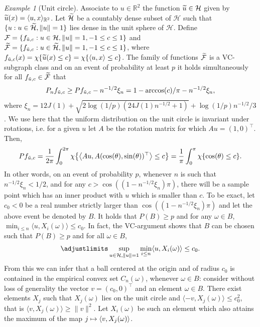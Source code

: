 \documentclass[AHL,Unicode,longabstracts,published]{cedram}
\theoremstyle{remark}
\newtheorem{examl}{Example}
\newcommand{\R}{\mathbb{R}}
\newcommand{\cH}{\mathcal{H}}
\newcommand{\clF}{\mathcal{F}}
\let\oldtilde\tilde
\renewcommand*{\tilde}[1]{\mathchoice{\widetilde{#1}}{\widetilde{#1}}{\oldtilde{#1}}{\oldtilde{#1}}}
\let\oldmapsto\mapsto
\renewcommand*{\mapsto}{\mathchoice{\longmapsto}{\oldmapsto}{\oldmapsto}{\oldmapsto}}
\let\originalleft\left
\let\originalright\right
\renewcommand{\left}{\mathopen{}\mathclose\bgroup\originalleft}
\renewcommand{\right}{\aftergroup\egroup\originalright}
\begin{document}
\begin{examl}[{Unit circle}]
Associate to $u \in \R^2$ the function $\tilde u \in \cH$ given by $\tilde u(x) = \langle u, x \rangle_{\R^2}$. Let $\tilde \cH$ be a countably dense subset of $\cH$ such that $\{u : u\in \tilde \cH, \|u\|=1\}$ lies dense in the unit sphere of $\cH$. Define $\clF = \{f_{\tilde u,c} : u \in \cH, \|u\|=1, -1 \leq c \leq 1 \}$ and $\tilde{\clF} = \{f_{\tilde u,c} : u \in \tilde{\cH},\linebreak \|u\|=1, -1 \leq c \leq 1 \}$, where $f_{\tilde u,c}(x) = \chi\{ \tilde u(x) \leq c\} = \chi\{\langle u, x\rangle \leq c\}$. The family of functions $\tilde{\clF}$ is a VC-subgraph class and on an event of probability at least $p$ it holds simultaneously for all $f_{\tilde u,c} \in \tilde{\clF}$ that
\begin{align*}
P_n f_{\tilde u,c} \geq P f_{\tilde u,c} - n^{-1/2} \xi_n = 1- \arccos(c)/\pi - n^{-1/2} \xi_n,
\end{align*}
where $\xi_n = 12 J(1) + \sqrt{2 \log(1/p) (24 J(1) n^{-1/2} + 1)} + \log(1/p)n^{-1/2}/3$. We use here that the uniform distribution on the unit circle is invariant under rotations, i.e. for a given $u$ let $A$ be the rotation matrix for which $Au = (1, 0)^\top$. Then,
\[
P f_{\tilde u,c} = \frac{1}{2\pi} \int_0^{2\pi} \chi\left\{\left\langle A u, A (\cos(\theta),\sin(\theta))^\top \right\rangle \leq c \right\} = \frac{1}{\pi} \int_0^{\pi} \chi\{\cos(\theta) \leq c \}.
\]
In other words, on an event of probability $p$, whenever $n$ is such that $n^{-1/2} \xi_n <1/2$, and for any $c > \cos((1-n^{-1/2}\xi_n) \pi)$, there will be a sample point which has an inner product with $u$ which is smaller than $c$. To be exact, let $c_0 < 0$ be a real number strictly larger than $\cos((1-n^{-1/2}\xi_n) \pi)$ and let the above event be denoted by $B$. It holds that $P(B) \geq p$ and for any $\omega \in B$, $\min_{i\leq n} \langle u, X_i(\omega) \rangle \leq c_0$. In fact, the VC-argument shows that $B$ can be chosen such that $P(B)\geq p$ and for all $\omega \in B$,
\[
\adjustlimits\sup_{u \in \cH, \|u\|=1} \min_{i\leq n} \langle u, X_i(\omega) \rangle \leq c_0.
\]
From this we can infer that a ball centered at the origin and of radius $c_0$ is contained in the empirical convex set $C_n(\omega)$, whenever $\omega \in B$: consider without loss of generality the vector $v= (c_0, 0)^\top$ and an element $\omega \in B$. There exist elements $X_j$ such that $X_j(\omega)$ lies on the unit circle and $\langle - v, X_j(\omega) \rangle \leq c_0^2$, that is $\langle v, X_j(\omega) \rangle \geq \|v\|^2$. Let $X_i(\omega)$ be such an element which also attains the maximum of the map $j \mapsto \langle v,X_j(\omega) \rangle$.


\end{examl}
\end{document}
